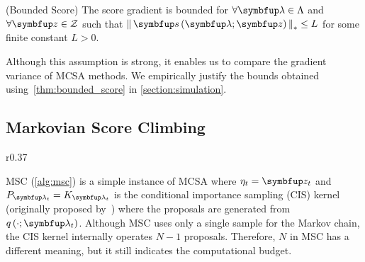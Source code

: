 \begin{assumption}{(Bounded Score)}\label{thm:bounded_score}
  The score gradient is bounded for \(\forall \vlambda \in \Lambda\) and \(\forall \vz \in \mathcal{Z}\) such that \(\norm{\vs\left(\vlambda; \vz\right)}_* \leq L \) for some finite constant \(L > 0\).
\end{assumption}
\vspace{-0.05in}
Although this assumption is strong, it enables us to compare the gradient variance of MCSA methods.
We empirically justify the bounds obtained using~\cref{thm:bounded_score} in \cref{section:simulation}.

\vspace{-0.07in}
\subsection{Markovian Score Climbing}
\vspace{-0.07in}

\begin{wrapfigure}[9]{r}{0.37\textwidth}
\vspace{-5ex}
\begin{minipage}[c]{0.37\textwidth}
  \centering
  \begin{algorithm2e}[H]
    \DontPrintSemicolon
    \SetAlgoLined
    \caption{MSC}\label{alg:msc}
  \end{algorithm2e}
\end{minipage}
\end{wrapfigure}
%
MSC (\cref{alg:msc}) is a simple instance of MCSA where \(\eta_t = \vz_t\) and \(P_{\vlambda_t} = K_{\vlambda_t}\) is the conditional importance sampling (CIS) kernel (originally proposed by~\citet{andrieu_uniform_2018}) where the proposals are generated from \(q\left(\cdot; \vlambda_t\right)\).
Although MSC uses only a single sample for the Markov chain, the CIS kernel internally operates \(N-1\) proposals.
Therefore, \(N\) in MSC has a different meaning, but it still indicates the computational budget.

